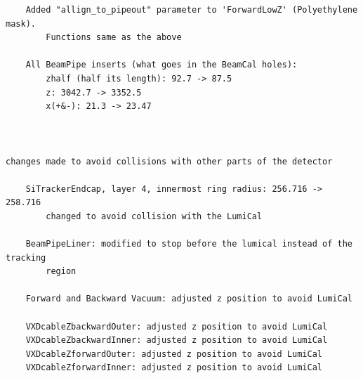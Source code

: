 \documentclass{report}
\begin{document}
\begin{verbatim}
    Added "allign_to_pipeout" parameter to 'ForwardLowZ' (Polyethylene mask).
        Functions same as the above 

    All BeamPipe inserts (what goes in the BeamCal holes):
        zhalf (half its length): 92.7 -> 87.5
        z: 3042.7 -> 3352.5
        x(+&-): 21.3 -> 23.47



changes made to avoid collisions with other parts of the detector

    SiTrackerEndcap, layer 4, innermost ring radius: 256.716 -> 258.716
        changed to avoid collision with the LumiCal

    BeamPipeLiner: modified to stop before the lumical instead of the tracking
        region

    Forward and Backward Vacuum: adjusted z position to avoid LumiCal

    VXDcableZbackwardOuter: adjusted z position to avoid LumiCal
    VXDcableZbackwardInner: adjusted z position to avoid LumiCal
    VXDcableZforwardOuter: adjusted z position to avoid LumiCal
    VXDcableZforwardInner: adjusted z position to avoid LumiCal
            \end{verbatim}





        
    
\end{document}
